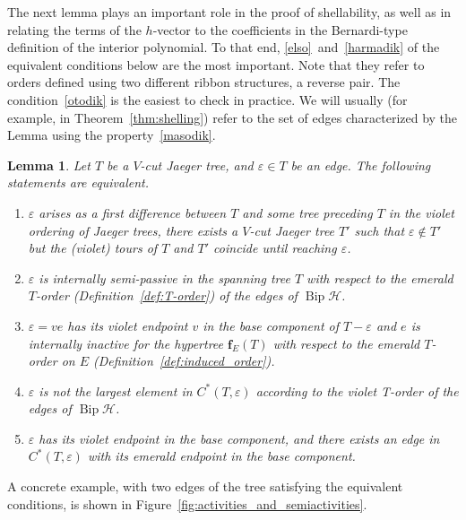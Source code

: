 \documentclass[10pt]{amsart}
\newtheorem{lemma}[theo]{Lemma}
\theoremstyle{definition}\newtheorem{defi}[theo]{Definition}
\theoremstyle{remark}\newtheorem{rema}[theo]{Remark}
\newcommand{\HH}{\mathcal H}
\DeclareMathOperator{\bip}{Bip}
\begin{document}
The next lemma plays an important role in the proof of shellability, as well as in relating the terms of the $h$-vector to the coefficients in the Bernardi-type definition of the interior polynomial. To that end, \ref{elso}~and~\ref{harmadik} of the equivalent conditions below are the most important. Note that they refer to orders defined using two different ribbon structures, a reverse pair. The condition~\ref{otodik} is the easiest to check in practice. We will usually (for example, in Theorem~\ref{thm:shelling}) refer to the set of edges characterized by the Lemma using the property~\ref{masodik}.

\begin{lemma}
\label{l:activities_description}
 Let $T$ be a $V$-cut Jaeger tree, and $\varepsilon \in T$ be an edge. The following statements are equivalent.
\begin{enumerate}[label=(\roman*)]
\item \label{elso}
 $\varepsilon$ arises as a first difference between $T$ and some tree preceding $T$ in the violet ordering of Jaeger trees, \ie there exists a $V$-cut Jaeger tree $T'$ such that $\varepsilon\not\in T'$ but the (violet) tours of $T$ and $T'$ coincide until reaching $\varepsilon$.
\item \label{masodik}
 $\varepsilon$ is internally semi-passive in the spanning tree $T$ with respect to the emerald $T$-order (Definition~\ref{def:T-order}) of the edges of $\bip \HH$.
\item \label{harmadik}
 $\varepsilon=ve$ has its violet endpoint $v$ in the base component of $T-\varepsilon$ and $e$ is internally inactive for the hypertree $\mathbf f_E(T)$ with respect to the emerald $T$-order on $E$ (Definition~\ref{def:induced_order}). 
\item \label{negyedik}
 $\varepsilon$ is not the largest element in $C^*(T,\varepsilon)$ according to the violet T-order of the edges of $\bip \HH$.
\item \label{otodik}
 $\varepsilon$ has its violet endpoint in the base component, and there exists an edge in $C^*(T,\varepsilon)$ with its emerald endpoint in the base component.
 \end{enumerate}
\end{lemma}

A concrete example, with two edges of the tree satisfying the equivalent conditions, is shown in Figure~\ref{fig:activities_and_semiactivities}.
\end{document}
